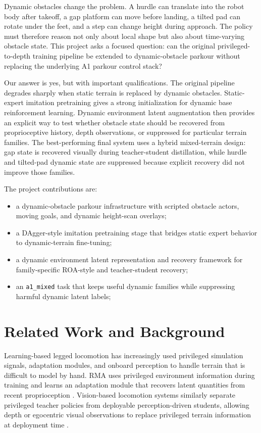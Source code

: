 \documentclass[conference]{IEEEtran}
\begin{document}
Dynamic obstacles change the problem. A hurdle can translate into the robot body after takeoff, a gap platform can move before landing, a tilted pad can rotate under the feet, and a step can change height during approach. The policy must therefore reason not only about local shape but also about time-varying obstacle state. This project asks a focused question: can the original privileged-to-depth training pipeline be extended to dynamic-obstacle parkour without replacing the underlying A1 parkour control stack?

Our answer is yes, but with important qualifications. The original pipeline degrades sharply when static terrain is replaced by dynamic obstacles. Static-expert imitation pretraining gives a strong initialization for dynamic base reinforcement learning. Dynamic environment latent augmentation then provides an explicit way to test whether obstacle state should be recovered from proprioceptive history, depth observations, or suppressed for particular terrain families. The best-performing final system uses a hybrid mixed-terrain design: gap state is recovered visually during teacher-student distillation, while hurdle and tilted-pad dynamic state are suppressed because explicit recovery did not improve those families.

The project contributions are:
\begin{itemize}
	\item a dynamic-obstacle parkour infrastructure with scripted obstacle actors, moving goals, and dynamic height-scan overlays;
	\item a DAgger-style imitation pretraining stage that bridges static expert behavior to dynamic-terrain fine-tuning;
	\item a dynamic environment latent representation and recovery framework for family-specific ROA-style and teacher-student recovery;
	\item an \texttt{a1\_mixed} task that keeps useful dynamic families while suppressing harmful dynamic latent labels;
\end{itemize}

\section{Related Work and Background}
Learning-based legged locomotion has increasingly used privileged simulation signals, adaptation modules, and onboard perception to handle terrain that is difficult to model by hand. RMA uses privileged environment information during training and learns an adaptation module that recovers latent quantities from recent proprioception \citep{kumar2021rma}. Vision-based locomotion systems similarly separate privileged teacher policies from deployable perception-driven students, allowing depth or egocentric visual observations to replace privileged terrain information at deployment time \citep{agarwal2022legged,miki2022learning}.
\end{document}
